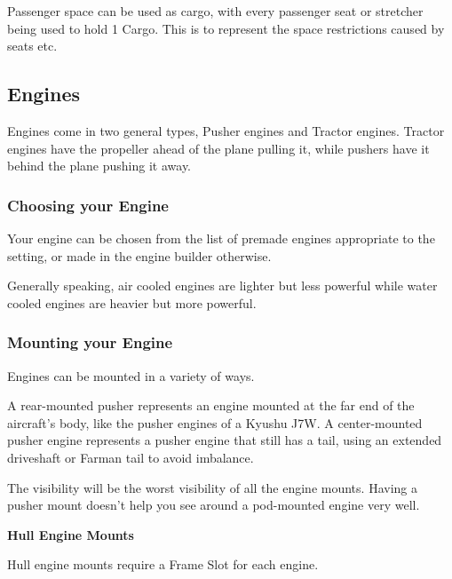 \documentclass{article}
\begin{document}
Passenger space can be used as cargo, with every passenger seat
or stretcher being used to hold 1 Cargo. This is to represent the space
restrictions caused by seats etc.

\subsection{Engines}
\label{_Engines}

Engines come in two general types, Pusher engines and Tractor engines.
Tractor engines have the propeller ahead of the plane pulling it, while
pushers have it behind the plane pushing it away.

\subsubsection{Choosing your Engine}
\label{_Choosing your Engine}

Your engine can be chosen from the list of premade engines appropriate
to the setting, or made in the engine builder otherwise.

Generally speaking, air cooled engines are lighter but less powerful
while water cooled engines are heavier but more powerful.

\subsubsection{Mounting your Engine}
\label{_Mounting your Engine}

Engines can be mounted in a variety of ways.

A rear-mounted pusher represents an engine mounted at the far end of the
aircraft's body, like the pusher engines of a Kyushu J7W. A
center-mounted pusher engine represents a pusher engine that still has a
tail, using an extended driveshaft or Farman tail to avoid imbalance.

The visibility will be the worst visibility of all the engine mounts.
Having a pusher mount doesn't help you see around a pod-mounted engine very well.


\textbf{Hull Engine Mounts}

Hull engine mounts require a Frame Slot for each engine.
\end{document}
